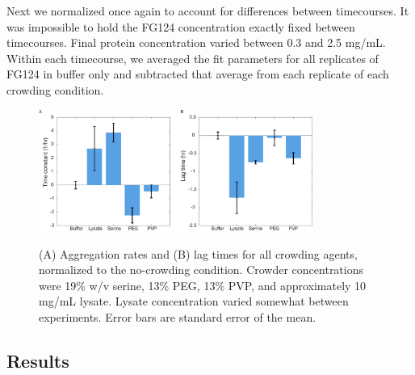 Next we normalized once again to account for differences between timecourses.  It was impossible to hold the FG124 concentration exactly fixed between timecourses.  Final protein concentration varied between 0.3 and 2.5 mg/mL. Within each timecourse, we averaged the fit parameters for all replicates of FG124 in buffer only and subtracted that average from each replicate of each crowding condition.


\begin{figure}[t!]
\caption[Aggregation rates and lag times for all crowding agents.]{(A) Aggregation rates and (B) lag times for all crowding agents, normalized to the no-crowding condition.  Crowder concentrations were 19\% w/v serine, 13\% PEG, 13\% PVP, and approximately 10 mg/mL lysate.  Lysate concentration varied somewhat between experiments. Error bars are standard error of the mean.}
\centering
\includegraphics[width=0.8\textwidth]{figs/ch05/barCharts.pdf}
\label{fig:tht-all-conditions}
\end{figure}



\subsection{Results}


